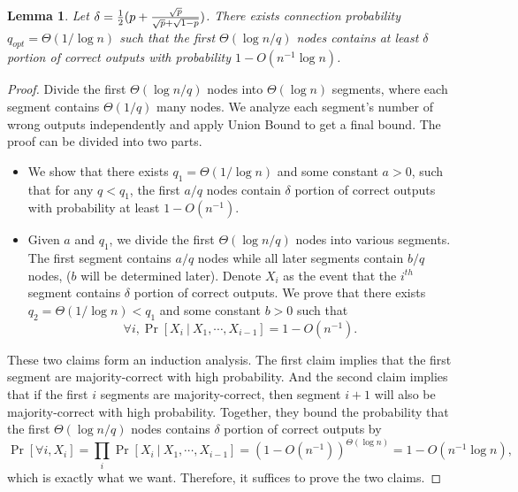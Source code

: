 \documentclass[a4paper,UKenglish]{lipics}
\newtheorem{lem}[thm]{Lemma}
\theoremstyle{definition}
\begin{document}
\begin{lem}
\label{lem:majorityfirstlogn/q}
Let $\delta = {1\over 2}(p + {\sqrt{p}\over \sqrt{p} + \sqrt{1-p}})$.
There exists connection probability $q_{opt} = \Theta(1/\log n)$ such that the first $\Theta(\log n/q)$ nodes 
	contains at least $\delta$ portion of correct outputs with probability $1 - O(n^{-1}\log n)$.
\end{lem}

\begin{proof}
Divide the first $\Theta(\log n/q)$ nodes into $\Theta(\log n)$ segments, where each segment contains $\Theta(1/q)$ many nodes.
We analyze each segment's number of wrong outputs independently and apply Union Bound to get a final bound.
The proof can be divided into two parts.
\begin{itemize}
\item We show that there exists $q_1 = \Theta(1/\log n)$ and some constant $a > 0$, such that for any $q < q_1$, 
	the first $a/q$ nodes contain $\delta$ portion of correct outputs with probability at least $1 - O(n^{-1})$.
\item Given $a$ and $q_1$, we divide the first $\Theta(\log n / q)$ nodes into various segments.
	The first segment contains $a/q$ nodes while all later segments contain $b/q$ nodes, ($b$ will be determined later).
	Denote $X_i$ as the event that the $i^{th}$ segment contains $\delta$ portion of correct outputs.
	We prove that there exists $q_2 = \Theta(1/\log n) < q_1$ and some constant $b > 0$ such that
	\begin{equation*}
		\forall i, \Pr[X_{i}~|~X_1, \dotsb, X_{i-1}] = 1 - O(n^{-1}).
	\end{equation*}
\end{itemize}
These two claims form an induction analysis.
The first claim implies that the first segment are majority-correct with high probability.
And the second claim implies that if the first $i$ segments are majority-correct, 
	then segment $i+1$ will also be majority-correct with high probability.
Together, they bound the probability that the first $\Theta(\log n / q)$ nodes contains $\delta$ portion of correct outputs by
\begin{equation*}
	\Pr[ \forall i, X_i] 
= 
	\prod_{i} \Pr[X_{i}~|~X_1, \dotsb, X_{i-1}] 
= 
	(1 - O(n^{-1}))^{\Theta(\log n)} = 1 - O(n^{-1}\log n),
\end{equation*}
which is exactly what we want.
Therefore, it suffices to prove the two claims.


\end{proof}
\end{document}
